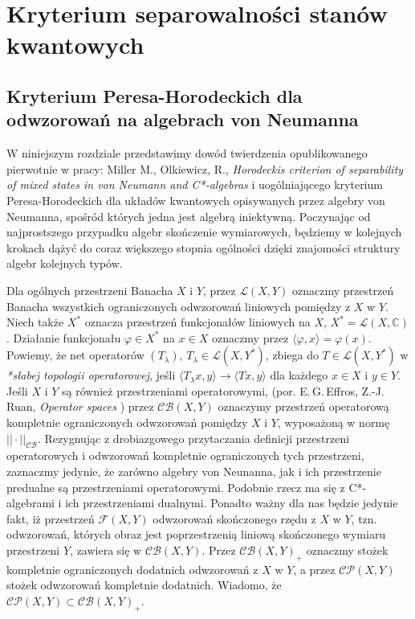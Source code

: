 \chapter{Kryterium separowalności stanów kwantowych}
\label{chp:PHcrit}
\section{Kryterium Peresa-Horodeckich dla odwzorowań na algebrach von Neumanna}
W niniejszym rozdziale przedstawimy dowód twierdzenia
opublikowanego pierwotnie w pracy:
Miller M., Olkiewicz, R.,
\emph{Horodeckis criterion of separability of mixed states in von Neumann and C*-algebras}
\cite{miller2014horodeckis}
i uogólniającego kryterium Peresa-Horodeckich dla układów
kwantowych opisywanych przez algebry von Neumanna,
spośród których jedna jest algebrą iniektywną.
Poczynając od najprostszego przypadku algebr skończenie wymiarowych,
będziemy w kolejnych krokach dążyć do coraz większego stopnia
ogólności dzięki znajomości struktury algebr kolejnych typów.

\vspace{0.5cm}
Dla ogólnych przestrzeni Banacha $X$ i $Y$, przez
$\mathcal{L}(X,Y)$
oznaczmy przestrzeń Banacha wszystkich ograniczonych odwzorowań
liniowych pomiędzy z $X$ w $Y$.
Niech także $X^{*}$ oznacza przestrzeń funkcjonałów liniowych na $X$,
$X^{*} = \mathcal{L}(X, \mathbb{C})$.
Działanie funkcjonału $\varphi \in X^{*}$ na $x \in X$
oznaczmy przez $\langle  \varphi , x \rangle = \varphi(x)$.
Powiemy, że net operatorów $(T_{\lambda})$,
$T_{\lambda} \in \mathcal{L}(X, Y^{*})$, zbiega do
$T \in \mathcal{L}(X, Y^{*})$ w \emph{*słabej topologii operatorowej}, jeśli
\label{page:weakstaroperatortop}
$\langle T_{\lambda} x, y \rangle \rightarrow \langle Tx, y \rangle$
dla każdego $x \in X$ i $y \in Y$.
Jeśli $X$ i $Y$ są również przestrzeniami operatorowymi,
(por. E.\,G.\,Effros, Z.-J.\,Ruan, \emph{Operator spaces} \cite{Effros2000})
przez $\mathcal{CB}(X,Y)$ oznaczymy przestrzeń operatorową
kompletnie ograniczonych odwzorowań pomiędzy $X$ i $Y$,
wyposażoną w normę
$|| \cdot ||_{\mathcal{CB}}$.
Rezygnując z drobiazgowego przytaczania definicji przestrzeni operatorowych
i odwzorowań kompletnie ograniczonych tych przestrzeni,
zaznaczmy jedynie, że zarówno algebry von Neunanna, jak i
ich przestrzenie predualne są przestrzeniami operatorowymi.
Podobnie rzecz ma się z C*-algebrami i ich przestrzeniami dualnymi.
Ponadto ważny dla nas będzie jedynie fakt, iż
przestrzeń $\mathcal{F}(X,Y)$
odwzorowań skończonego rzędu z $X$ w $Y$,
tzn. odwzorowań, których obraz jest poprzestrzenią liniową skończonego wymiaru
przestrzeni $Y$, zawiera się w $\mathcal{CB}(X,Y)$.
Przez $\mathcal{CB}(X,Y)_{+}$
oznaczmy stożek kompletnie ograniczonych dodatnich odwzorowań
z $X$ w $Y$, a przez $\mathcal{CP}(X,Y)$ stożek odwzorowań kompletnie dodatnich.
Wiadomo, że $\mathcal{CP}(X,Y) \subset \mathcal{CB}(X,Y)_{+}$.

